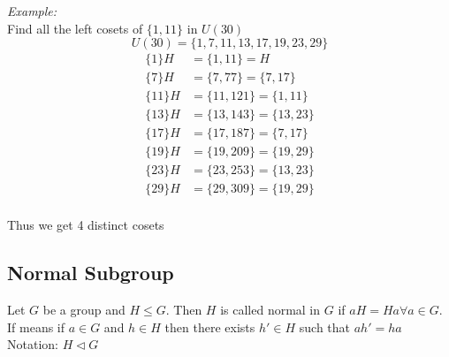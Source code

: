 \documentclass[11pt,letterpaper]{article}
\newenvironment{example}                             
        {\noindent\textit{Example:}\\}
	{}
\begin{document}
\begin{example}
  Find all the left cosets of $\{1, 11\}$ in $U(30)$\\
  \[
    U(30) = \{1, 7, 11, 13, 17, 19, 23, 29\}
  \]
  \begin{align*}
    \{1\}H &= \{1,11\} = H\\
    \{7\}H &= \{7,77\} = \{7, 17\}\\
    \{11\}H &= \{11,121\} = \{1, 11\}\\
    \{13\}H &= \{13,143\} = \{13, 23\}\\
    \{17\}H &= \{17,187\} = \{7, 17\}\\
    \{19\}H &= \{19,209\} = \{19, 29\}\\
    \{23\}H &= \{23,253\} = \{13, 23\}\\
    \{29\}H &= \{29,309\} = \{19, 29\}\\
  \end{align*}
  
  Thus we get 4 distinct cosets
\end{example}

\subsection{Normal Subgroup}
Let $G$ be a group and $H \leq G$. Then $H$ is called normal in $G$ if $aH = Ha \forall a \in G$.\\ 
If means if $a\in G$ and $h\in H$ then there exists $h' \in H$ such that $ah' = ha$\\

Notation: $H\triangleleft G$
\end{document}
